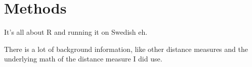 \chapter{Methods}
It's all about R and running it on Swedish eh.

There is a lot of background information, like other distance
measures and the underlying math of the distance measure I did use.
